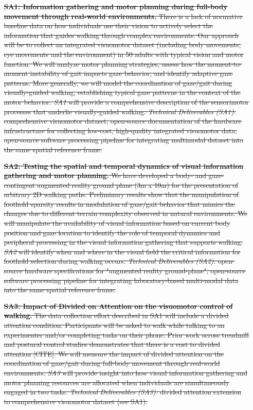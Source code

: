 \documentclass[
]{article}
\begin{document}
\st{\textbf{SA1: Information gathering and motor planning during
full-body movement through real-world environments.} There is a lack of
normative baseline data on how individuals use their vision to actively
select the information that guides walking through complex environments.
Our approach will be to collect an integrated visuomotor dataset
(including body movements, eye movements and the environment) in 50
adults with typical vision and motor function. We will analyze motor
planning strategies, assess how the moment-to-moment instability of gait
impacts gaze behavior, and identify adaptive gaze patterns. More
generally, we will model the coordination of gaze/gait during
visually-guided walking, establishing typical gaze patterns in the
context of the motor behavior. \emph{SA1} will provide a comprehensive
description of the sensorimotor processes that underlie visually-guided
walking. \emph{Technical Deliverables (SA1):} comprehensive visuomotor
dataset; open-source documentation of the hardware infrastructure for
collecting low-cost, high-quality integrated visuomotor data;
open-source software processing pipeline for integrating multimodal
dataset into the same spatial reference frame.}

\st{\textbf{SA2: Testing the spatial and temporal dynamics of visual
information gathering and motor planning.} We have developed a body- and
gaze-contingent augmented reality ground plane (3m x 10m) for the
presentation of arbitrary 2D walking paths. Preliminary results show
that the manipulation of foothold sparsity results in modulation of
gaze/gait behavior that mimics the changes due to different terrain
complexity observed in natural environments. We will manipulate the
availability of visual information based on current body position and
gaze location to identify the role of temporal dynamics and peripheral
processing in the visual information gathering that supports walking.
\emph{SA2} will identify when and where in the visual field the critical
information for foothold selection during walking occurs.
\emph{Technical Deliverables (SA2):} open-source hardware specifications
for "augmented reality ground-plane"; open-source software processing
pipeline for integrating laboratory-based multi-modal data into the same
spatial reference frame.}

\st{\textbf{SA3: Impact of Divided on Attention on the visuomotor
control of walking.} The data collection effort described in SA1 will
include a divided attention condition. Participants will be asked to
walk while talking to an experimenter and/or completing tasks on their
phone. Prior work across treadmill and postural control studies
demonstrates that there is a cost to divided attention {[}CITE{]}. We
will measure the impact of divided attention on the coordination of
gaze/gait during full-body movement through real-world environments.
\emph{SA3} will provide insight into how visual information gathering
and motor planning resources are allocated when individuals are
simultaneously engaged in two tasks. \emph{Technical Deliverables
(SA3):} divided attention extension to comprehensive visuomotor dataset
(see SA1).}
\end{document}

